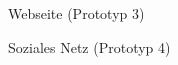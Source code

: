 \begin{figure}[ht]
    \centering
    \caption{Webseite (Prototyp 3)}
    \label{fig:prt3}
\end{figure}

\begin{figure}[ht]
    \centering
    \caption{Soziales Netz (Prototyp 4)}
    \label{fig:prt4}
\end{figure}
